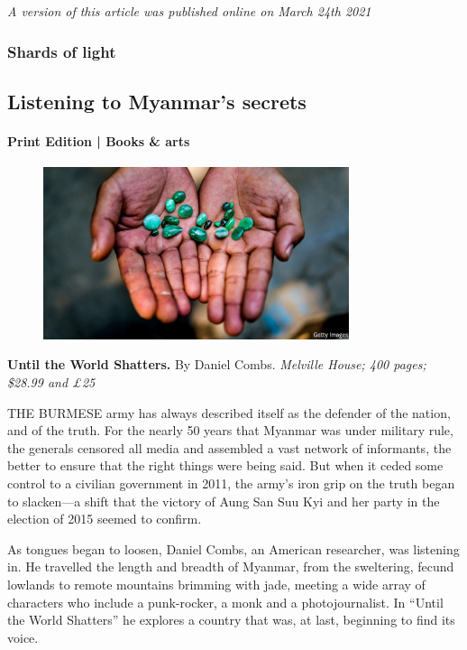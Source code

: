 \documentclass{article}
\begin{document}
\emph{A version of this article was published online on March 24th 2021} 
\clearpage
\subsubsection{Shards of light }
\subsection{Listening to Myanmar's secrets }
\paragraph{Print Edition | Books \& arts  \quad \color{gray}{Mar 27th 2021 }}
\begin{figure}[h]
\centering
\includegraphics[width=0.8\textwidth]{images/20210327_bkp001.jpg}
\end{figure}
\textbf{Until the World Shatters.} By Daniel Combs. \emph{Melville House; 400 pages; \$28.99 and £25} 

\lettrine{T}HE BURMESE army has always described itself as the defender of the nation, and of the truth. For the nearly 50 years that Myanmar was under military rule, the generals censored all media and assembled a vast network of informants, the better to ensure that the right things were being said. But when it ceded some control to a civilian government in 2011, the army's iron grip on the truth began to slacken---a shift that the victory of Aung San Suu Kyi and her party in the election of 2015 seemed to confirm. 

As tongues began to loosen, Daniel Combs, an American researcher, was listening in. He travelled the length and breadth of Myanmar, from the sweltering, fecund lowlands to remote mountains brimming with jade, meeting a wide array of characters who include a punk-rocker, a monk and a photojournalist. In ``Until the World Shatters'' he explores a country that was, at last, beginning to find its voice. 
\end{document}
